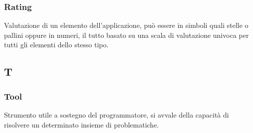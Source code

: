 \subsubsection*{Rating}
Valutazione di un elemento dell'applicazione, può essere in simboli quali stelle o pallini oppure in numeri, il tutto basato su una scala di valutazione univoca per tutti gli elementi dello stesso tipo.

\subsection*{T}
\subsubsection*{Tool}
Strumento utile a sostegno del programmatore, si avvale della capacità di risolvere un determinato insieme di problematiche.

